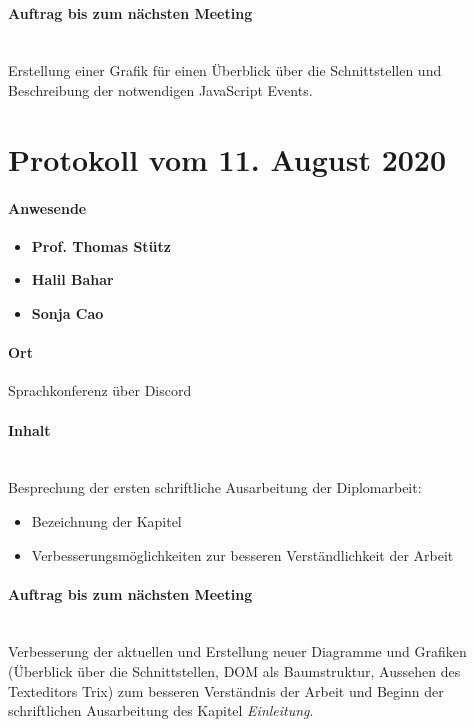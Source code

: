 \paragraph{Auftrag bis zum nächsten Meeting}\mbox{}\\
Erstellung einer Grafik für einen Überblick über die Schnittstellen und Beschreibung der notwendigen JavaScript Events.

\section{Protokoll vom 11. August 2020}

\paragraph{Anwesende}
\begin{itemize}
	\item{\textbf{Prof. Thomas Stütz}}
	\item{\textbf{Halil Bahar}}
	\item{\textbf{Sonja Cao}}
\end{itemize}

\paragraph{Ort}
Sprachkonferenz über Discord

\paragraph{Inhalt}\mbox{}\\
Besprechung der ersten schriftliche Ausarbeitung der Diplomarbeit:
\begin{itemize}
	\item{Bezeichnung der Kapitel}
	\item{Verbesserungsmöglichkeiten zur besseren Verständlichkeit der Arbeit}
\end{itemize}

\paragraph{Auftrag bis zum nächsten Meeting}\mbox{}\\
Verbesserung der aktuellen und Erstellung neuer Diagramme und Grafiken (Überblick über die Schnittstellen, DOM als Baumstruktur, Aussehen des Texteditors Trix) zum besseren Verständnis der Arbeit und Beginn der schriftlichen Ausarbeitung des Kapitel {\em{Einleitung}}.
